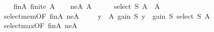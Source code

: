 \begin{isabellebody}
\ \ \isamarkupfalse%
\ finA{\isacharcolon}{\kern0pt}\ {\isachardoublequoteopen}finite\ A{\isachardoublequoteclose}\isanewline
\ \ \isamarkupfalse%
\ neA{\isacharcolon}{\kern0pt}\ {\isachardoublequoteopen}A\ {\isasymnoteq}\ {\isacharbraceleft}{\kern0pt}{\isacharbraceright}{\kern0pt}{\isachardoublequoteclose}\isanewline
\ \ \isamarkupfalse%
\ {\isachardoublequoteopen}select\ S\ A\ {\isasymin}\ A{\isachardoublequoteclose}\isanewline
\ \ \ \ \isamarkupfalse%
\ select{\isacharunderscore}{\kern0pt}mem{\isacharbrackleft}{\kern0pt}OF\ finA\ neA{\isacharbrackright}{\kern0pt}\ \isakeywordONE{{\isachardot}{\kern0pt}}\isamarkupfalse%
\isanewline
\ \ \isamarkupfalse%
\ {\isachardoublequoteopen}{\isasymforall}y\ {\isasymin}\ A{\isachardot}{\kern0pt}\ gain\ S\ y\ {\isasymle}\ gain\ S\ {\isacharparenleft}{\kern0pt}select\ S\ A{\isacharparenright}{\kern0pt}{\isachardoublequoteclose}\isanewline
\ \ \ \ \isamarkupfalse%
\ select{\isacharunderscore}{\kern0pt}max{\isacharbrackleft}{\kern0pt}OF\ finA\ neA{\isacharbrackright}{\kern0pt}\ \isakeywordONE{{\isachardot}{\kern0pt}}\isamarkupfalse%
\isanewline
{}\isamarkupfalse%
%
\endisatagproof
{\isafoldproof}%
%
\isadelimproof
\isanewline
%
\endisadelimproof
\isanewline
{}\isamarkupfalse%
\isanewline
%
\isadelimtheory
\isanewline
%
\endisadelimtheory
%
\isatagtheory
{}\isamarkupfalse%
%
\endisatagtheory
{\isafoldtheory}%
%
\isadelimtheory
%
\endisadelimtheory
%
\end{isabellebody}%
\endinput
